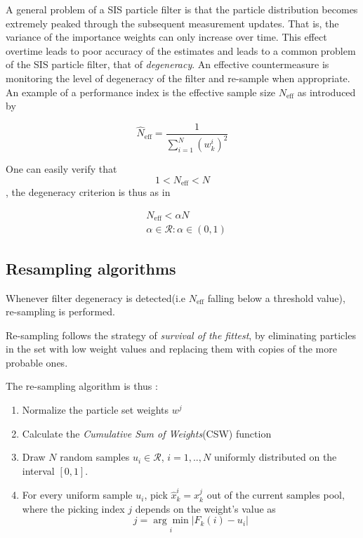A general problem of a SIS particle filter is that the particle distribution becomes extremely peaked through the subsequent measurement updates. That is, the variance of the importance weights can only increase over time. This effect overtime leads to poor accuracy of the estimates and leads to a common problem of the SIS particle filter, that of \emph{degeneracy}. An effective countermeasure is monitoring the level of degeneracy of the filter and re-sample when appropriate. An example of a performance index is the effective sample size $N_{\text{eff}}$ as introduced by \cite{Kong1994}


\begin{equation}
\hat{N}_{\text{eff}} = \frac{1}{\sum_{i=1}^{N}(w_k^i)^2}
\end{equation}


One can easily verify that $$1 < N_{\text{eff}} < N$$ , the degeneracy criterion is thus as in 

\begin{equation}\label{eq:criterion_degeneracy}
\begin{aligned}
&N_{\text{eff}} < \alpha N \\&\alpha \in \mathcal{R}: \alpha \in (0,1)
\end{aligned}
\end{equation}

\subsection{Resampling algorithms}\label{ssec:resamplingPF}


Whenever filter degeneracy is detected(i.e $N_{\text{eff}}$ falling below a threshold value), re-sampling is performed.


Re-sampling follows the strategy of \emph{survival of the fittest}, by eliminating particles in the set with low weight values and replacing them with copies of the more probable ones.


The re-sampling algorithm is thus \cite{Ristic2004}:

\begin{enumerate}
	\item Normalize the particle set weights $w^j$
	\item Calculate the \emph{Cumulative Sum of Weights}(CSW) function
	\item Draw $N$ random samples $u_i \in \mathcal{R}$, $i=1,..,N$ uniformly distributed on the interval $[0,1]$.
	\item For every uniform sample $u_i$, pick $\hat{x}_k^i = x_k^j$ out of the current samples pool, where the picking index $j$ depends on the weight's value as \[ j = \underset{i}{\arg\min} |{F_k(i)-u_i}| \]

\end{enumerate}

